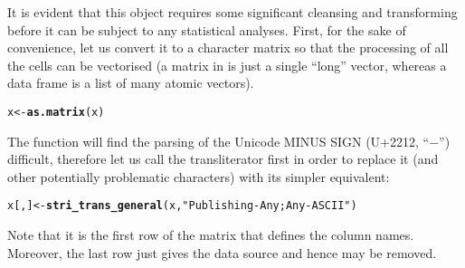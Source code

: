 \documentclass[nojss]{jss}\usepackage[]{graphicx}\usepackage[]{xcolor}
\makeatletter
\newcommand{\hlstr}[1]{\textcolor[rgb]{0.192,0.494,0.8}{#1}}%
\newcommand{\hlstd}[1]{\textcolor[rgb]{0.345,0.345,0.345}{#1}}%
\newcommand{\hlkwb}[1]{\textcolor[rgb]{0.69,0.353,0.396}{#1}}%
\newcommand{\hlkwd}[1]{\textcolor[rgb]{0.737,0.353,0.396}{\textbf{#1}}}%
\newenvironment{kframe}{%
 \def\at@end@of@kframe{}%
 \ifinner\ifhmode%
  \def\at@end@of@kframe{\end{minipage}}%
  \begin{minipage}{\columnwidth}%
 \fi\fi%
 \def\FrameCommand##1{\hskip\@totalleftmargin \hskip-\fboxsep
 \colorbox{shadecolor}{##1}\hskip-\fboxsep
     \hskip-\linewidth \hskip-\@totalleftmargin \hskip\columnwidth}%
 \MakeFramed {\advance\hsize-\width
   \@totalleftmargin\z@ \linewidth\hsize
   \@setminipage}}%
 {\par\unskip\endMakeFramed%
 \at@end@of@kframe}
\newenvironment{knitrout}{}{} %
\makeatother
\begin{document}
It is evident that this object requires some significant cleansing
and transforming before it can be subject to any statistical analyses.
First, for the sake of convenience, let us convert it to a character
matrix so that the processing of all the cells can be vectorised
(a matrix in  is just a single ``long'' vector,
whereas a data frame is a list of many atomic vectors).

\begin{knitrout}
\color{fgcolor}\begin{kframe}
\begin{alltt}
\hlstd{x} \hlkwb{<-} \hlkwd{as.matrix}\hlstd{(x)}
\end{alltt}
\end{kframe}
\end{knitrout}

The  function will find the parsing of
the Unicode MINUS SIGN (U+2212, ``−'') difficult,
therefore let us call the transliterator first in order to replace it
(and other potentially problematic characters) with its simpler equivalent:

\begin{knitrout}
\color{fgcolor}\begin{kframe}
\begin{alltt}
\hlstd{x[, ]} \hlkwb{<-} \hlkwd{stri_trans_general}\hlstd{(x,} \hlstr{"Publishing-Any; Any-ASCII"}\hlstd{)}
\end{alltt}
\end{kframe}
\end{knitrout}

Note that it is the first row of the matrix that defines the column names.
Moreover, the last row just gives the data source and hence may be removed.
\end{document}
